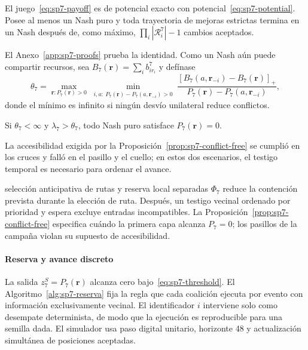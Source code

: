 \begin{teorema}
\label{thm:sp7-exact-potential}
El juego~\eqref{eq:sp7-payoff} es de potencial exacto con potencial~\eqref{eq:sp7-potential}. Posee al menos un Nash puro y toda trayectoria de mejoras estrictas termina en un Nash después de, como máximo, $\prod_i|\mathcal R_i^7|-1$ cambios aceptados.
\end{teorema}

El Anexo~\ref{app:sp7-proofs} prueba la identidad. Como un Nash aún puede compartir recursos, sea $B_7(\boldsymbol r)=\sum_i b_{ir_i}^7$ y defínase
\begin{equation}
\label{eq:sp7-threshold}
 \theta_7=\max_{\boldsymbol r:P_7(\boldsymbol r)>0}
 \min_{\substack{i,a:\ P_7(\boldsymbol r)-P_7(a,\boldsymbol r_{-i})>0}}
 \frac{[B_7(a,\boldsymbol r_{-i})-B_7(\boldsymbol r)]_+}
 {P_7(\boldsymbol r)-P_7(a,\boldsymbol r_{-i})},
\end{equation}
donde el mínimo es infinito si ningún desvío unilateral reduce conflictos.

\begin{proposicion}
\label{prop:sp7-conflict-free}
Si $\theta_7<\infty$ y $\lambda_7>\theta_7$, todo Nash puro satisface $P_7(\boldsymbol r)=0$.
\end{proposicion}

La accesibilidad exigida por la Proposición~\ref{prop:sp7-conflict-free} se cumplió en los cruces y falló en el pasillo y el cuello; en estos dos escenarios, el testigo temporal es necesario para ordenar el avance.

\begin{samepage}
\begin{contribucion}{selección anticipativa de rutas y reserva local separadas}
$\Phi_7$ reduce la contención prevista durante la elección de ruta. Después, un testigo vecinal ordenado por prioridad y espera excluye entradas incompatibles. La Proposición~\ref{prop:sp7-conflict-free} especifica cuándo la primera capa alcanza $P_7=0$; los pasillos de la campaña violan su supuesto de accesibilidad.
\end{contribucion}
\end{samepage}

\paragraph{Reserva y avance discreto}

La salida $z_7^S=P_7(\boldsymbol r)$ alcanza cero bajo~\eqref{eq:sp7-threshold}. El
Algoritmo~\ref{alg:sp7-reserva} fija la regla que cada coalición ejecuta por
evento con información exclusivamente vecinal. El identificador $i$ interviene
solo como desempate determinista, de modo que la ejecución es reproducible para
una semilla dada. El simulador usa paso digital unitario, horizonte 48 y
actualización simultánea de posiciones aceptadas.

